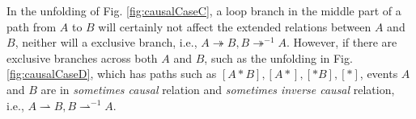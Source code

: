 \documentclass{llncs}
\begin{document}
In the unfolding of Fig. \ref{fig:causalCaseC}, a loop branch in the middle part of a path from $A$ to $B$ will certainly not affect the extended relations between $A$ and $B$, neither will a exclusive branch, i.e., $A\twoheadrightarrow B,B\twoheadrightarrow^{-1}A$. However, if there are exclusive branches across both $A$ and $B$, such as the unfolding in Fig. \ref{fig:causalCaseD}, which has paths such as $[A*B],[A*],[*B],[*]$, events $A$ and $B$ are in \textit{sometimes causal} relation and \textit{sometimes inverse causal} relation, i.e., $A\rightharpoonup B,B\rightharpoonup^{-1}A$.

\begin{figure}[!htb]
\centering
{}
\end{figure}
\end{document}
